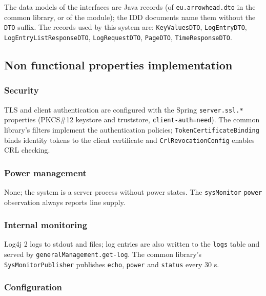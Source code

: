 \documentclass[a4paper]{arrowhead}
\begin{document}
The data models of the interfaces are Java records (of \texttt{eu.arrowhead.dto} in the common library, or of the module); the IDD documents name them without the \texttt{DTO} suffix. The records used by this system are: \texttt{KeyValuesDTO}, \texttt{LogEntryDTO}, \texttt{Log\allowbreak{}Entry\allowbreak{}List\allowbreak{}Response\allowbreak{}DTO}, \texttt{LogRequestDTO}, \texttt{PageDTO}, \texttt{TimeResponseDTO}.

\subsection{Non functional properties implementation}

\subsubsection{Security}

TLS and client authentication are configured with the Spring \texttt{server.\allowbreak{}ssl.\allowbreak{}*} properties (PKCS\#12 keystore and truststore, \texttt{client-\allowbreak{}auth=\allowbreak{}need}). The common library's filters implement the authentication policies; \texttt{Token\allowbreak{}Certificate\allowbreak{}Binding} binds identity tokens to the client certificate and \texttt{Crl\allowbreak{}Revocation\allowbreak{}Config} enables CRL checking.

\subsubsection{Power management}

None; the system is a server process without power states. The \texttt{sysMonitor} \texttt{power} observation always reports line supply.

\subsubsection{Internal monitoring}

Log4j 2 logs to stdout and files; log entries are also written to the \texttt{logs} table and served by \texttt{general\allowbreak{}Management.\allowbreak{}get-\allowbreak{}log}. The common library's \texttt{Sys\allowbreak{}Monitor\allowbreak{}Publisher} publishes \texttt{echo}, \texttt{power} and \texttt{status} every 30 s.

\subsubsection{Configuration}
\end{document}
